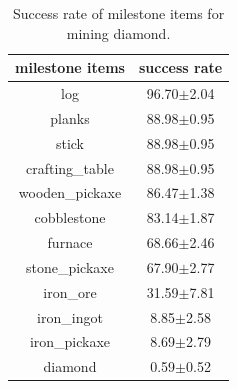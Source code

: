 \begin{table}[H]
\centering
\caption{Success rate of milestone items for mining diamond.}
\label{tab:milestone_succ}
\renewcommand\arraystretch{1.1}
\begin{tabular}{cc}
\toprule
milestone items & success rate \\ \midrule
log & 96.70$\pm$2.04 \\
planks & 88.98$\pm$0.95 \\
stick & 88.98$\pm$0.95 \\
crafting\_table & 88.98$\pm$0.95 \\
wooden\_pickaxe & 86.47$\pm$1.38 \\
cobblestone & 83.14$\pm$1.87 \\
furnace & 68.66$\pm$2.46 \\
stone\_pickaxe & 67.90$\pm$2.77 \\
iron\_ore & 31.59$\pm$7.81 \\
iron\_ingot & 8.85$\pm$2.58 \\
iron\_pickaxe & 8.69$\pm$2.79 \\
diamond & 0.59$\pm$0.52 \\ \bottomrule
\end{tabular}
\end{table}